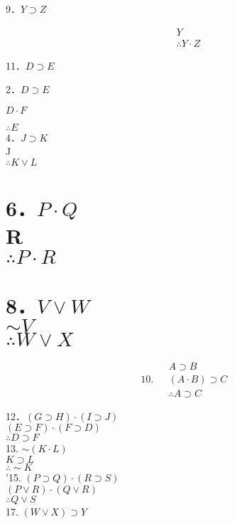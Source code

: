 9．$Y \supset Z$

$$
\begin{aligned}
& Y \\
& \therefore Y \cdot Z
\end{aligned}
$$

11．$D \supset E$

2．$D \supset E$

$D \cdot F$

$\therefore E$\\
4．$J \supset K$\\
J\\
$\therefore K \vee L$

\section*{6．$P \cdot Q$ \\
 R \\
 $\therefore P \cdot R$}
\section*{8．$V \vee W$ \\
 $\sim V$ \\
 $\therefore W \vee X$}
$$
\text { 10. } \begin{aligned}
& A \supset B \\
& (A \cdot B) \supset C \\
& \therefore A \supset C
\end{aligned}
$$

12．$(G \supset H) \cdot(I \supset J)$\\
$(E \supset F) \cdot(F \supset D)$\\
$\therefore D \supset F$\\
13. $\sim(K \cdot L)$\\
$K \supset L$\\
$\therefore \sim K$\\
'15. $(P \supset Q) \cdot(R \supset S)$\\
$(P \vee R) \cdot(Q \vee R)$\\
$\therefore Q \vee S$\\
17. $(W \vee X) \supset Y$

